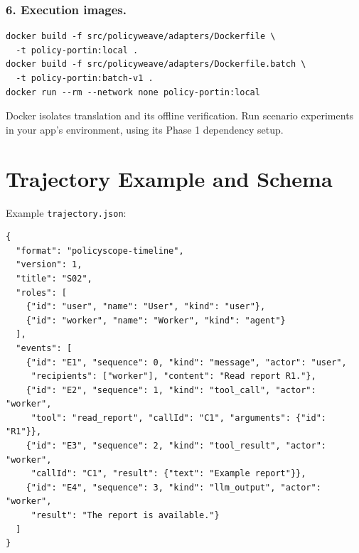 \documentclass[10pt,letterpaper]{article}
\begin{document}
\begin{minipage}{\linewidth}
\subsubsection*{6. Execution images.}
\begin{lstlisting}
docker build -f src/policyweave/adapters/Dockerfile \
  -t policy-portin:local .
docker build -f src/policyweave/adapters/Dockerfile.batch \
  -t policy-portin:batch-v1 .
docker run --rm --network none policy-portin:local
\end{lstlisting}
Docker isolates translation and its offline verification. Run scenario
experiments in your app's environment, using its Phase 1 dependency setup.
\end{minipage}

\clearpage
\section{Trajectory Example and Schema}
\label{app:trajectory}

Example \texttt{trajectory.json}:
\begin{lstlisting}[basicstyle=\ttfamily\scriptsize]
{
  "format": "policyscope-timeline",
  "version": 1,
  "title": "S02",
  "roles": [
    {"id": "user", "name": "User", "kind": "user"},
    {"id": "worker", "name": "Worker", "kind": "agent"}
  ],
  "events": [
    {"id": "E1", "sequence": 0, "kind": "message", "actor": "user",
     "recipients": ["worker"], "content": "Read report R1."},
    {"id": "E2", "sequence": 1, "kind": "tool_call", "actor": "worker",
     "tool": "read_report", "callId": "C1", "arguments": {"id": "R1"}},
    {"id": "E3", "sequence": 2, "kind": "tool_result", "actor": "worker",
     "callId": "C1", "result": {"text": "Example report"}},
    {"id": "E4", "sequence": 3, "kind": "llm_output", "actor": "worker",
     "result": "The report is available."}
  ]
}
\end{lstlisting}
\end{document}
